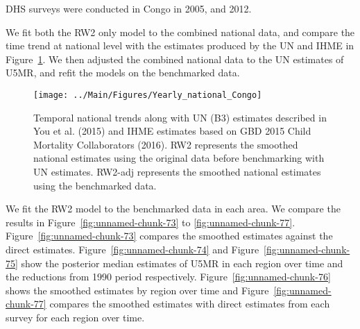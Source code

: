 \documentclass[12pt]{article}\usepackage[]{graphicx}\usepackage[]{color}
\newenvironment{knitrout}{}{} %
\begin{document}


DHS surveys were conducted in Congo in 2005, and 2012.

We fit both the RW2 only model to the combined national data, and compare the time trend at national level with the estimates produced by the UN and IHME in Figure~\ref{fig:unnamed-chunk-72}. We then adjusted the combined national data to the UN estimates of U5MR, and refit the models on the benchmarked data. 

\begin{knitrout}
\color{fgcolor}\begin{figure}[bht]

{\centering \texttt{[image: ../Main/Figures/Yearly\_national\_Congo]} 

}

\caption[Temporal national trends along with UN (B3) estimates described in You et al]{Temporal national trends along with UN (B3) estimates described in You et al. (2015) and IHME estimates based on GBD 2015 Child Mortality Collaborators (2016). RW2 represents the smoothed national estimates using the original data before benchmarking with UN estimates. RW2-adj represents the smoothed national estimates using the benchmarked data.}\label{fig:unnamed-chunk-72}
\end{figure}


\end{knitrout}
 

We fit the RW2 model to the benchmarked data in each area. 
We compare the results in Figure~\ref{fig:unnamed-chunk-73} to \ref{fig:unnamed-chunk-77}.
Figure~\ref{fig:unnamed-chunk-73} compares the smoothed estimates against the direct estimates. Figure~\ref{fig:unnamed-chunk-74} and Figure~\ref{fig:unnamed-chunk-75} show the posterior median estimates of U5MR in each region over time and the reductions from 1990 period respectively.
Figure~\ref{fig:unnamed-chunk-76} shows the smoothed estimates by region over time and Figure~\ref{fig:unnamed-chunk-77} compares the smoothed estimates with direct estimates from each survey for each region over time.


\end{document}
